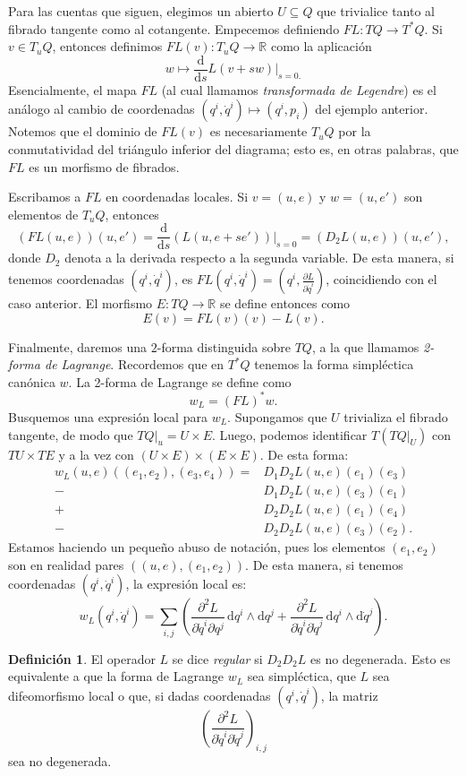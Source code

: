 \documentclass[11pt, a4paper]{article}
\newcommand{\RR}{\mathbb{R}}
\newcommand{\dd}{\mathrm{d}}
\newcommand{\dds}{\frac{\dd}{\dd s}}
\newcommand{\pardev}[2]{\frac{\partial #1}{\partial #2}}
\theoremstyle{plain}
\theoremstyle{definition}
\newtheorem{defn}[prop]{Definición}
\begin{document}
Para las cuentas que siguen, elegimos un abierto $U\subseteq Q$ que trivialice tanto al fibrado tangente como al cotangente. Empecemos definiendo $FL:TQ\to T^*Q$. Si $v\in T_uQ$, entonces definimos $FL(v):T_uQ\to\RR$ como la aplicación
\[w\mapsto \dds L(v+sw)\bigg|_{s=0.}\]
Esencialmente, el mapa $FL$ (al cual llamamos \emph{transformada de Legendre}) es el análogo al cambio de coordenadas $(q^i,\dot{q}^i)\mapsto (q^i,p_i)$ del ejemplo anterior. Notemos que el dominio de $FL(v)$ es necesariamente $T_uQ$ por la conmutatividad del triángulo inferior del diagrama; esto es, en otras palabras, que $FL$ es un morfismo de fibrados.

Escribamos a $FL$ en coordenadas locales. Si $v=(u,e)$ y $w=(u,e')$ son elementos de $T_uQ$, entonces
\[\left(FL(u,e)\right)(u,e') = \dds\left(L(u,e+se')\right)\bigg|_{s=0}=(D_2L(u,e))(u,e'),\]
donde $D_2$ denota a la derivada respecto a la segunda variable. De esta manera, si tenemos coordenadas $(q^i,\dot{q}^i)$, es $FL(q^i, \dot{q}^i)=(q^i,\pardev{L}{\dot{q}^i})$, coincidiendo con el caso anterior. El morfismo $E:TQ\to \RR$ se define entonces como
\[E(v)=FL(v)(v)-L(v).\]

Finalmente, daremos una $2$-forma distinguida sobre $TQ$, a la que llamamos \emph{2-forma de Lagrange}. Recordemos que en $T^*Q$ tenemos la forma simpléctica canónica $w$. La 2-forma de Lagrange se define como
\[w_L = (FL)^*w.\]
Busquemos una expresión local para $w_L$. Supongamos que $U$ trivializa el fibrado tangente, de modo que $TQ|_u=U\times E$. Luego, podemos identificar $T(TQ|_U)$ con $TU\times TE$ y a la vez con $(U\times E)\times(E\times E)$. De esta forma:
\begin{align*} 
w_L(u,e)((e_1,e_2),(e_3,e_4))= &D_1D_2L(u,e)(e_1)(e_3)\\
-&D_1D_2L(u,e)(e_3)(e_1)\\
+&D_2D_2L(u,e)(e_1)(e_4)\\
-&D_2D_2L(u,e)(e_3)(e_2). \label{wL-local}
\end{align*}
Estamos haciendo un pequeño abuso de notación, pues los elementos $(e_1,e_2)$ son en realidad pares $((u,e),(e_1,e_2))$. De esta manera, si tenemos coordenadas $(q^i,\dot{q}^i)$, la expresión local es:
\[w_L(q^i,\dot{q}^i)=\sum_{i,j} \left(\frac{\partial^2 L}{\partial\dot{q}^i\partial q^j}\,\dd q^i\wedge \dd q^j + \frac{\partial^2 L}{\partial\dot{q}^i\partial\dot{q}^j}\,\dd q^i\wedge \dd \dot{q}^j \right).\]

\begin{defn} El operador $L$ se dice \emph{regular} si $D_2D_2 L$ es no degenerada. Esto es equivalente a que la forma de Lagrange $w_L$ sea simpléctica, que $L$ sea difeomorfismo local o que, si dadas coordenadas $(q^i,\dot{q}^i)$, la matriz
\[\left( \frac{\partial^2 L}{\partial\dot{q}^i\partial\dot{q}^j} \right)_{i,j} \]
sea no degenerada.
\end{defn}
\end{document}
